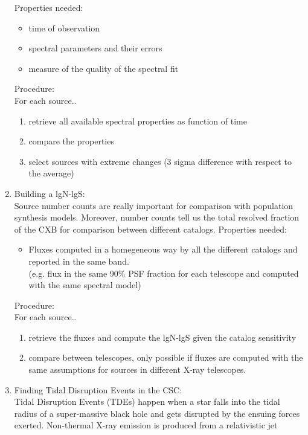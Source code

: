 \begin{enumerate}
Properties needed:
  \begin{itemize}
  \item time of observation
  \item spectral parameters and their errors
  \item measure of the quality of the spectral fit
  \end{itemize}
Procedure: \\
  For each source.. 
  \begin{enumerate}
  \item retrieve all available spectral properties as function of time
  \item compare the properties
  \item select sources with extreme changes (3 sigma difference with respect to the average)
  \end{enumerate}
\item Building a lgN-lgS:\\
Source number counts are really important for comparison with population synthesis models. Moreover, number counts tell us the total resolved fraction of the CXB for comparison between different catalogs.
Properties needed:
  \begin{itemize}
  \item Fluxes computed in a homegeneous way by all the different catalogs and reported in the same band. \\
    (e.g. flux in the same 90\% PSF fraction for each telescope and computed with the same spectral model)
  \end{itemize}
Procedure: \\
  For each source..
  \begin{enumerate}
  \item retrieve the fluxes and compute the lgN-lgS given the catalog sensitivity
  \item compare between telescopes, only possible if fluxes are computed with the same assumptions for sources in different X-ray telescopes.
  \end{enumerate}
\item Finding Tidal Disruption Events in the CSC: \\
  Tidal Disruption Events (TDEs) happen when a star falls into the tidal radius
  of a super-massive black hole and gets disrupted by the ensuing forces
  exerted. Non-thermal X-ray emission is produced from a relativistic jet

\end{enumerate}
